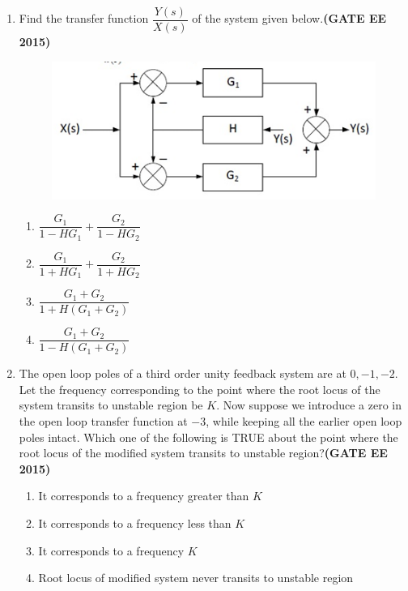 \documentclass[a4paper,12pt]{exam}
\theoremstyle{remark}
\begin{document}
\begin{enumerate}
\item Find the transfer function $\dfrac{Y(s)}{X(s)}$ of the system given below.\hfill{\textbf{(GATE EE 2015)}}
\begin{figure}[H]
    \centering
    \includegraphics[width=0.5\columnwidth]{figs/Q 64.png}
    \caption{}
    \label{fig:placeholder}
\end{figure}
\begin{multicols}{2}
        \begin{enumerate}
        \item $\dfrac{G_1}{1-HG_1} + \dfrac{G_2}{1-HG_2}$
        \item $\dfrac{G_1}{1+HG_1} + \dfrac{G_2}{1+HG_2}$
        \item $\dfrac{G_1+G_2}{1+H(G_1+G_2)}$
        \item $\dfrac{G_1+G_2}{1-H(G_1+G_2)}$
    \end{enumerate}
\end{multicols}


\item The open loop poles of a third order unity feedback system are at $0, -1, -2$. Let the frequency corresponding to the point where the root locus of the system transits to unstable region be $K$. Now suppose we introduce a zero in the open loop transfer function at $-3$, while keeping all the earlier open loop poles intact. Which one of the following is TRUE about the point where the root locus of the modified system transits to unstable region?\hfill{\textbf{(GATE EE 2015)}}
    \begin{enumerate}
        \item It corresponds to a frequency greater than $K$
        \item It corresponds to a frequency less than $K$
        \item It corresponds to a frequency $K$
        \item Root locus of modified system never transits to unstable region
    \end{enumerate}
\end{enumerate}
\end{document}
